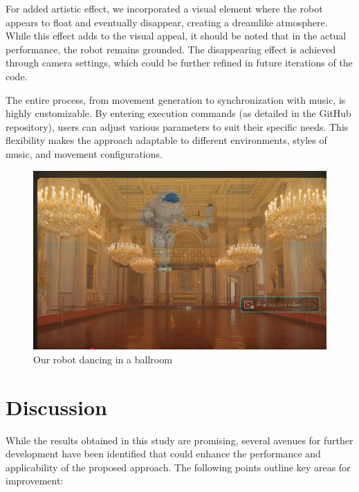 \documentclass{amsart}
\theoremstyle{definition}
\theoremstyle{plain}
\begin{document}
For added artistic effect, we incorporated a visual element where the robot appears to float and eventually disappear, creating a dreamlike atmosphere. 
While this effect adds to the visual appeal, it should be noted that in the actual performance, the robot remains grounded. 
The disappearing effect is achieved through camera settings, which could be further refined in future iterations of the code.

The entire process, from movement generation to synchronization with music, is highly customizable. By entering execution commands (as detailed in the GitHub repository), 
users can adjust various parameters to suit their specific needs. 
This flexibility makes the approach adaptable to different environments, styles of music, and movement configurations.

\begin{figure}
  \includegraphics[width = 0.7 \columnwidth]{img/ball.png}
  \caption{Our robot dancing in a ballroom}\label{fig:ballroom}
\end{figure}


\section{Discussion}

While the results obtained in this study are promising, several avenues for further development have been identified that could enhance the performance and applicability of the proposed approach. 
The following points outline key areas for improvement:
\end{document}
